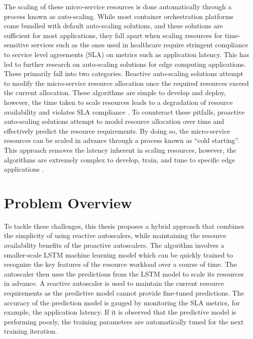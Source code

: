 The scaling of these micro-service resources is done automatically through a process known as auto-scaling. While most container orchestration platforms come bundled with default auto-scaling solutions, and these solutions are sufficient for most applications, they fall apart when scaling resources for time-sensitive services such as the ones used in healthcare require stringent compliance to service level agreements (SLA) on metrics such as application latency. This has led to further research on auto-scaling solutions for edge computing applications. These primarily fall into two categories. Reactive auto-scaling solutions attempt to modify the micro-service resource allocation once the required resources exceed the current allocation. These algorithms are simple to develop and deploy, however, the time taken to scale resources leads to a degradation of resource availability and violates SLA compliance \cite{podolskiy2018iaas}. To counteract these pitfalls, proactive auto-scaling solutions attempt to model resource allocation over time and effectively predict the resource requirements. By doing so, the micro-service resources can be scaled in advance through a process known as ``cold starting''. This approach removes the latency inherent in scaling resources, however, the algorithms are extremely complex to develop, train, and tune to specific edge applications \cite{straesser2022not}.

\section{Problem Overview}
\label{sec:ch1-problem-overview}

To tackle these challenges, this thesis proposes a hybrid approach that combines the simplicity of using reactive autoscalers, while maintaining the resource availability benefits of the proactive autoscalers. The algorithm involves a smaller-scale LSTM machine learning model which can be quickly trained to recognize the key features of the resource workload over a course of time. The autoscaler then uses the predictions from the LSTM model to scale its resources in advance. A reactive autoscaler is used to maintain the current resource requirements as the predictive model cannot provide fine-tuned predictions. The accuracy of the prediction model is gauged by monitoring the SLA metrics, for example, the application latency. If it is observed that the predictive model is performing poorly, the training parameters are automatically tuned for the next training iteration.\par

